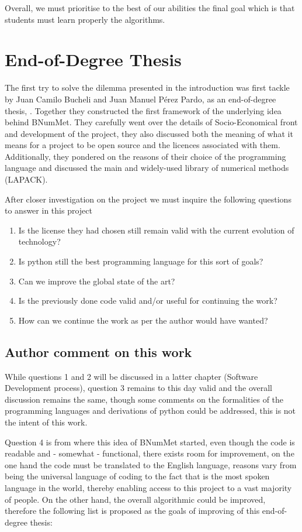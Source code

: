 Overall, we must prioritise to the best of our abilities the final goal which is that students must learn properly the algorithms. 

\section{End-of-Degree Thesis}
The first try to solve the dilemma presented in the introduction was first tackle by Juan Camilo Bucheli and Juan Manuel Pérez Pardo, as an end-of-degree thesis, \cite{}. Together they constructed the first framework of the underlying idea behind BNumMet.
They carefully went over the details of Socio-Economical front and development of the project, they also discussed both the meaning of what it means for a project to be open source and the licences associated with them. Additionally, they pondered on the reasons of their choice of the programming language and discussed the main and widely-used library of numerical methods (LAPACK). 


After closer investigation on the project we must inquire the following questions to answer in this project
\begin{enumerate}
    \item Is the license they had chosen still remain valid with the current evolution of technology?
    \item Is python still the best programming language for this sort of goals?
    \item Can we improve the global state of the art?
    \item Is the previously done code valid and/or useful for continuing the work?
    \item How can we continue the work as per the author would have wanted?
\end{enumerate}


\subsection{Author comment on this work}
While questions 1 and 2 will be discussed in a latter chapter (Software Development process), question 3 remains to this day valid and the overall discussion remains the same, though some comments on the formalities of the programming languages and derivations of python could be addressed, this is not the intent of this work.

Question 4 is from where this idea of BNumMet started, even though the code is readable and - somewhat - functional, there exists room for improvement, on the one hand the code must be translated to the English language, reasons vary from being the universal language of coding to the fact that is the most spoken language in the world, thereby enabling access to this project to a vast majority of people. On the other hand, the overall algorithmic could be improved, therefore the following list is proposed as the goals of improving of this end-of-degree thesis:

